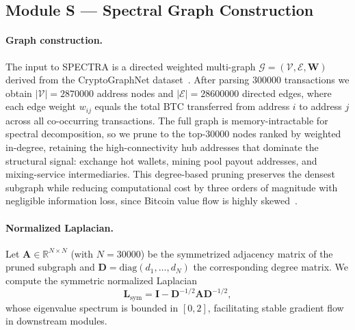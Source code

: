 \documentclass[journal]{IEEEtran}
\begin{document}
\subsection{Module S — Spectral Graph Construction}
\label{sec:module_s}

\paragraph{Graph construction.}
The input to \textsc{SPECTRA} is a directed weighted multi-graph
$\mathcal{G} = (\mathcal{V}, \mathcal{E}, \mathbf{W})$ derived from the
CryptoGraphNet dataset~\cite{cryptographnet2024}.
After parsing \num{300000} transactions we obtain
$|\mathcal{V}| = \num{2870000}$ address nodes and
$|\mathcal{E}| = \num{28600000}$ directed edges, where each edge weight
$w_{ij}$ equals the total BTC transferred from address $i$ to address $j$
across all co-occurring transactions.
The full graph is memory-intractable for spectral decomposition, so we prune
to the top-\num{30000} nodes ranked by weighted in-degree, retaining the
high-connectivity hub addresses that dominate the structural signal: exchange
hot wallets, mining pool payout addresses, and mixing-service intermediaries.
This degree-based pruning preserves the densest subgraph while reducing
computational cost by three orders of magnitude with negligible information
loss, since Bitcoin value flow is highly skewed~\cite{Kondor2014}.

\paragraph{Normalized Laplacian.}
Let $\mathbf{A} \in \mathbb{R}^{N \times N}$ (with $N = \num{30000}$) be the
symmetrized adjacency matrix of the pruned subgraph and
$\mathbf{D} = \mathrm{diag}(d_1, \ldots, d_N)$ the corresponding degree
matrix.
We compute the symmetric normalized Laplacian
\begin{equation}
  \mathbf{L}_{\mathrm{sym}}
    = \mathbf{I} - \mathbf{D}^{-1/2}\mathbf{A}\mathbf{D}^{-1/2},
  \label{eq:lsym}
\end{equation}
whose eigenvalue spectrum is bounded in $[0, 2]$, facilitating stable
gradient flow in downstream modules.
\end{document}
